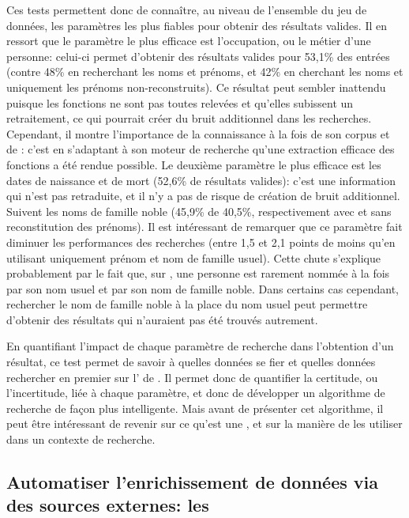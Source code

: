 Ces tests permettent donc de connaître, au niveau de l'ensemble du jeu de données, les paramètres les plus fiables pour obtenir des résultats valides. Il en ressort que le paramètre le plus efficace est l'occupation, ou le métier d'une personne: celui-ci permet d'obtenir des résultats valides pour 53,1\% des entrées (contre 48\% en recherchant les noms et prénoms, et 42\% en cherchant les noms et uniquement les prénoms non-reconstruits). Ce résultat peut sembler inattendu puisque les fonctions ne sont pas toutes relevées et qu'elles subissent un retraitement, ce qui pourrait créer du bruit additionnel dans les recherches. Cependant, il montre l'importance de la connaissance à la fois de son corpus et de \wkd{}: c'est en s'adaptant à son moteur de recherche qu'une extraction efficace des fonctions a été rendue possible. Le deuxième paramètre le plus efficace est les dates de naissance et de mort (52,6\% de résultats valides): c'est une information qui n'est pas retraduite, et il n'y a pas de risque de création de bruit additionnel. Suivent les noms de famille noble (45,9\% de 40,5\%, respectivement avec et sans reconstitution des prénoms). Il est intéressant de remarquer que ce paramètre fait diminuer les performances des recherches (entre 1,5 et 2,1 points de moins qu'en utilisant uniquement prénom et nom de famille usuel). Cette chute s'explique probablement par le fait que, sur \wkd{}, une personne est rarement nommée à la fois par son nom usuel et par son nom de famille noble. Dans certains cas cependant, rechercher le nom de famille noble à la place du nom usuel peut permettre d'obtenir des résultats qui n'auraient pas été trouvés autrement.

En quantifiant l'impact de chaque paramètre de recherche dans l'obtention d'un résultat, ce test permet de savoir à quelles données se fier et quelles données rechercher en premier sur l'\api{} de \wkd{}. Il permet donc de quantifier la certitude, ou l'incertitude, liée à chaque paramètre, et donc de développer un algorithme de recherche de façon plus intelligente. Mais avant de présenter cet algorithme, il peut être intéressant de revenir sur ce qu'est une \api{}, et sur la manière de les utiliser dans un contexte de recherche.

\subsection{Automatiser l'enrichissement de données via des sources externes: les \api{}}

